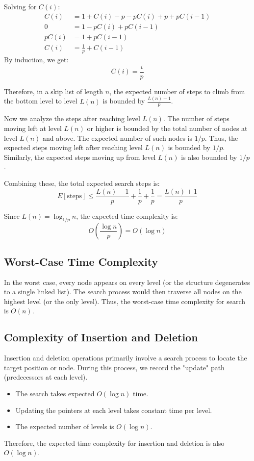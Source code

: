 \documentclass[a4paper,12pt]{article}
\begin{document}
Solving for $C(i)$:
\begin{align*}
C(i) &= 1 + C(i) - p - pC(i) + p + pC(i-1) \\
0 &= 1 - pC(i) + pC(i-1) \\
pC(i) &= 1 + pC(i-1) \\
C(i) &= \frac{1}{p} + C(i-1)
\end{align*}
By induction, we get:
\[ C(i) = \frac{i}{p} \]

Therefore, in a skip list of length $n$, the expected number of steps to climb from the bottom level to level $L(n)$ is bounded by $\frac{L(n) - 1}{p}$.

Now we analyze the steps after reaching level $L(n)$.
The number of steps moving left at level $L(n)$ or higher is bounded by the total number of nodes at level $L(n)$ and above. The expected number of such nodes is $1/p$. Thus, the expected steps moving left after reaching level $L(n)$ is bounded by $1/p$. Similarly, the expected steps moving up from level $L(n)$ is also bounded by $1/p$.

Combining these, the total expected search steps is:
\[ E[\text{steps}] \le \frac{L(n) - 1}{p} + \frac{1}{p} + \frac{1}{p} = \frac{L(n) + 1}{p} \]

Since $L(n) = \log_{1/p} n$, the expected time complexity is:
\[ O\left(\frac{\log n}{p}\right) = O(\log n) \]

\subsection{Worst-Case Time Complexity}
In the worst case, every node appears on every level (or the structure degenerates to a single linked list). The search process would then traverse all nodes on the highest level (or the only level). Thus, the worst-case time complexity for search is $O(n)$.

\subsection{Complexity of Insertion and Deletion}
Insertion and deletion operations primarily involve a search process to locate the target position or node. During this process, we record the "update" path (predecessors at each level).
\begin{itemize}
    \item The search takes expected $O(\log n)$ time.
    \item Updating the pointers at each level takes constant time per level.
    \item The expected number of levels is $O(\log n)$.
\end{itemize}
Therefore, the expected time complexity for insertion and deletion is also $O(\log n)$.
\end{document}
